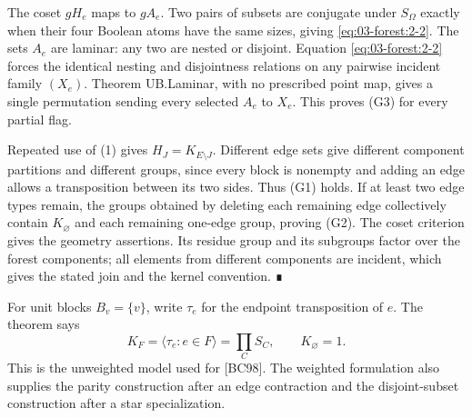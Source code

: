 The coset \(gH_e\) maps to \(gA_e\). Two pairs of subsets are conjugate under \(S_\Omega\) exactly when their four Boolean atoms have the same sizes, giving \eqref{eq:03-forest:2-2}. The sets \(A_e\) are laminar: any two are nested or disjoint. Equation \eqref{eq:03-forest:2-2} forces the identical nesting and disjointness relations on any pairwise incident family \((X_e)\). Theorem UB.Laminar, with no prescribed point map, gives a single permutation sending every selected \(A_e\) to \(X_e\). This proves (G3) for every partial flag.

Repeated use of (1) gives \(H_J=K_{E\setminus J}\). Different edge sets give different component partitions and different groups, since every block is nonempty and adding an edge allows a transposition between its two sides. Thus (G1) holds. If at least two edge types remain, the groups obtained by deleting each remaining edge collectively contain \(K_\varnothing\) and each remaining one-edge group, proving (G2). The coset criterion gives the geometry assertions. Its residue group and its subgroups factor over the forest components; all elements from different components are incident, which gives the stated join and the kernel convention. ∎

For unit blocks \(B_v=\{v\}\), write \(\tau_e\) for the endpoint transposition of \(e\). The theorem says \begin{equation}
K_F=\langle\tau_e:e\in F\rangle
 =\prod_C S_C,\qquad K_\varnothing=1.
\label{eq:03-forest:2-3}
\end{equation} This is the unweighted model used for {[}BC98{]}. The weighted formulation also supplies the parity construction after an edge contraction and the disjoint-subset construction after a star specialization.
